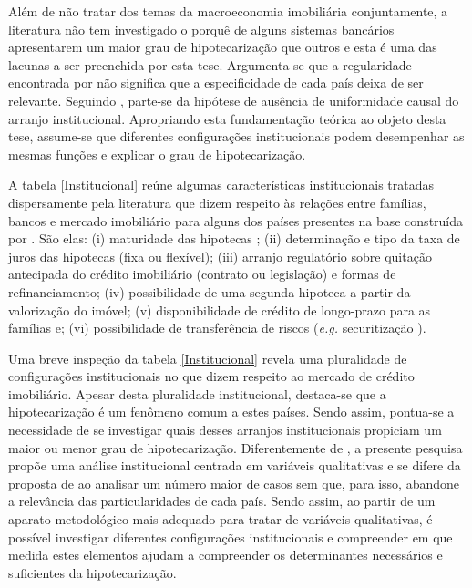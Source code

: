 Além de não tratar dos temas da macroeconomia imobiliária conjuntamente, a literatura não tem investigado o porquê de alguns sistemas bancários apresentarem um maior grau de hipotecarização que outros e esta é uma das lacunas a ser preenchida por esta tese.
Argumenta-se que a regularidade encontrada por \textcite{jorda_great_2016}
não significa que a especificidade de cada país deixa de ser relevante. 
Seguindo \textcite{chang_institutions_2011},  parte-se da hipótese de ausência de uniformidade causal do arranjo institucional.
Apropriando esta fundamentação teórica ao objeto desta tese,  assume-se que diferentes configurações institucionais podem desempenhar as mesmas funções e explicar o grau de hipotecarização. %

A tabela \ref{Institucional} reúne algumas características institucionais tratadas dispersamente pela literatura que dizem respeito às relações entre famílias, bancos e mercado imobiliário para alguns dos países presentes na base construída por \textcite{jorda_rate_2019}. São elas: 
    (i) maturidade das hipotecas \cite{green_american_2005}; 
    (ii) determinação  e tipo da taxa de juros das hipotecas (fixa ou flexível); 
    (iii) arranjo regulatório sobre quitação antecipada do crédito imobiliário (contrato ou legislação) e formas de refinanciamento;
    (iv) possibilidade de uma segunda hipoteca a partir da valorização do imóvel;
    (v) disponibilidade de crédito de longo-prazo para as famílias \cite{schwartz_politics_2009} e; 
    (vi) possibilidade de transferência de riscos (\textit{e.g.} securitização \cite{european_central_bank_housing_2010}).
    
    




Uma breve inspeção da tabela \ref{Institucional} revela uma pluralidade de configurações institucionais no que dizem respeito ao mercado de crédito imobiliário. 
Apesar desta pluralidade institucional, destaca-se que a hipotecarização é um fenômeno comum a estes países.
Sendo assim, pontua-se a necessidade de se investigar quais desses arranjos institucionais propiciam um maior ou menor grau de hipotecarização.
Diferentemente de \textcites{karwowski_financialisation_2019}{mertzanis_financialisation_2019}, a presente pesquisa propõe uma análise institucional centrada em variáveis qualitativas e se difere da proposta de \textcites{becker_peripheral_2010}{lapavitsas_financialisation_2013} ao analisar um número maior de casos sem que, para isso, abandone a relevância das particularidades de cada país.
Sendo assim, ao partir de um aparato metodológico mais adequado para tratar de variáveis qualitativas, é possível investigar diferentes configurações institucionais e compreender em que medida estes elementos ajudam a compreender os determinantes necessários e suficientes da hipotecarização.

